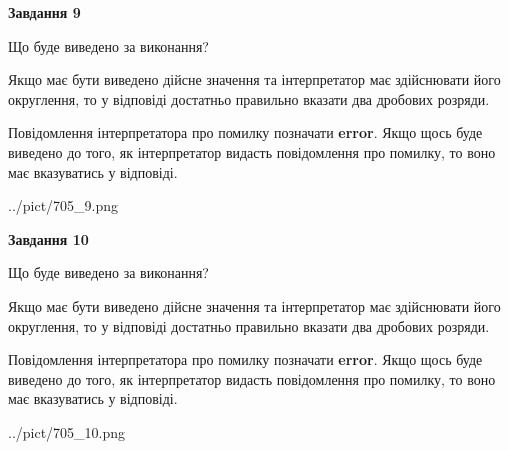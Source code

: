 \documentclass[12pt, ukrainian]{article}
\begin{document}
{\begin {Large}
{\begin {center}\textbf{Завдання 9}\end {center}}\par
Що буде виведено за виконання? \par

Якщо має бути виведено дійсне значення та інтерпретатор має здійснювати його округлення, 
то у відповіді достатньо правильно вказати два дробових розряди.

Повідомлення інтерпретатора про помилку позначати \textbf{error}.
Якщо щось буде виведено до того, як інтерпретатор видасть повідомлення про помилку, 
то воно має вказуватись у відповіді. \par

\begin{center}
	{../pict/705_9.png}
\end{center}
\newpage

{\begin {center}\textbf{Завдання 10}\end {center}}\par
Що буде виведено за виконання? \par

Якщо має бути виведено дійсне значення та інтерпретатор має здійснювати його округлення, 
то у відповіді достатньо правильно вказати два дробових розряди.

Повідомлення інтерпретатора про помилку позначати \textbf{error}.
Якщо щось буде виведено до того, як інтерпретатор видасть повідомлення про помилку, 
то воно має вказуватись у відповіді. \par

\begin{center}
	{../pict/705_10.png}
\end{center}
\newpage

\end {Large}}
\end{document}
